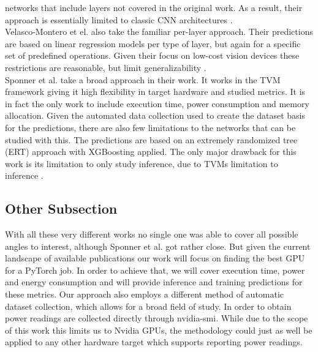 networks that include layers not covered in the original work. As a result, their approach is essentially
limited to classic CNN architectures \cite{gianniti_performance_nodate}. \\
Velasco-Montero et el. also take the familiar per-layer approach. Their predictions are based on linear
regression models per type of layer, but again for a specific set of predefined operations. Given their 
focus on low-cost vision devices these restrictions are reasonable, but limit generalizability \cite{velasco-montero_previous_2020}. \\
Sponner et al. take a broad approach in their work. It works in the TVM framework giving it high flexibility
in target hardware and studied metrics. It is in fact the only work to include execution time, power
consumption and memory allocation. Given the automated data collection used to create the dataset basis
for the predictions, there are also few limitations to the networks that can be studied with this. 
The predictions are based on an extremely randomized tree (ERT) approach with XGBoosting applied. The 
only major drawback for this work is its limitation to only study inference, due to TVMs limitation to inference \cite{sponner_ai-driven_2022}. \\

\subsection{Other Subsection}
With all these very different works no single one was able to cover all possible angles to interest,
although Sponner et al. got rather close. But given the current landscape of available publications
our work will focus on finding the best GPU for a PyTorch job. In order to achieve that, we will cover
execution time, power and energy consumption and will provide inference and training predictions for these
metrics. Our approach also employs a different method of automatic dataset collection, which allows
for a broad field of study. In order to obtain power readings are collected directly through nvidia-smi.
While due to the scope of this work this limits us to Nvidia GPUs, the methodology could just as well be 
applied to any other hardware target which supports reporting power readings. \\


